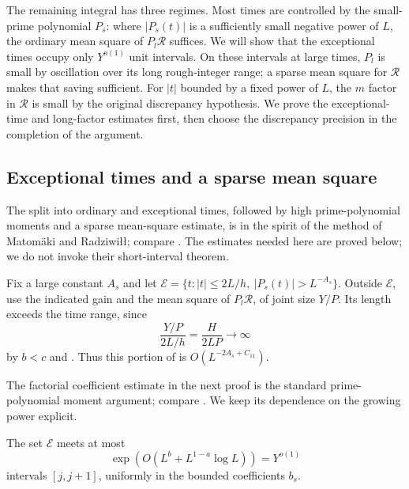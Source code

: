 The remaining integral has three regimes. Most times are controlled
by the small-prime polynomial $P_s$: where $|P_s(t)|$ is a sufficiently
small negative power of $L$, the ordinary mean square of $P_l\mathcal R$
suffices. We will show that the exceptional times occupy only
$Y^{o(1)}$ unit intervals. On these intervals at large times,
$P_l$ is small by oscillation over its long rough-integer range;
a sparse mean square for $\mathcal R$ makes that saving sufficient.
For $|t|$ bounded by a fixed power of $L$, the $m$ factor in
$\mathcal R$ is small by the original discrepancy hypothesis.
We prove the exceptional-time and long-factor estimates first, then
choose the discrepancy precision in the completion of the argument.

\subsection{Exceptional times and a sparse mean square}

The split into ordinary and exceptional times, followed by high
prime-polynomial moments and a sparse mean-square estimate, is in the
spirit of the method of Matom{\"a}ki and Radziwi{\l}{\l};
compare \cite[Section~2.1 and Section~4, Lemmas~8--9]{MatomakiRadziwill2016}.
The estimates needed here are proved below; we do not invoke their
short-interval theorem.

Fix a large constant $A_s$ and let
$\mathcal E=\{t:|t|\leq2L/h,\ |P_s(t)|>L^{-A_s}\}$.
Outside $\mathcal E$, use the indicated gain and the mean square
of $P_l\mathcal R$, of joint size $Y/P$. Its length exceeds the
time range, since
\[
 \frac{Y/P}{2L/h}=\frac H{2LP}\longrightarrow\infty
\]
by $b<c$ and .
Thus this portion of  is
$O(L^{-2A_s+C_{11}})$.

The factorial coefficient estimate in the next proof is the standard
prime-polynomial moment argument; compare
\cite[Lemma~3 and its proof]{Soundararajan2009}. We keep its dependence
on the growing power explicit.

\begin{lemma}\label{lem:exceptional-times}
The set $\mathcal E$ meets at most
\[
 \exp\!\left(O(L^b+L^{1-a}\log L)\right)=Y^{o(1)}
\]
intervals $[j,j+1]$, uniformly in the bounded coefficients $b_s$.
\end{lemma}


